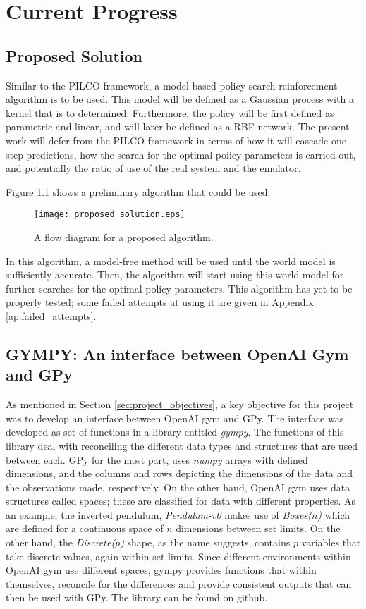 \chapter{Current Progress}
\section{Proposed Solution} \label{sec:proposed_solution}

Similar to the PILCO framework, a model based policy search reinforcement algorithm is to be used. This model will be defined as a Gaussian process with a kernel that is to determined. Furthermore, the policy will be first defined as parametric and linear, and will later be defined as a RBF-network. The present work will defer from the PILCO framework in terms of how it will cascade one-step predictions, how the search for the optimal policy parameters is carried out, and potentially the ratio of use of the real system and the emulator. 

Figure \ref{fig:proposed_solution} shows a preliminary algorithm that could be used. 

\begin{figure} \centering \scalebox{0.5} {\texttt{[image: proposed\_solution.eps]}}\caption{A flow diagram for a proposed algorithm.}\label{fig:proposed_solution}
\end{figure}

In this algorithm, a model-free method will be used until the world model is sufficiently accurate. Then, the algorithm will start using this world model for further searches for the optimal policy parameters. This algorithm has yet to be properly tested; some failed attempts at using it are given in Appendix \ref{ap:failed_attempts}.
%
\\
%
\section{GYMPY: An interface between OpenAI Gym and GPy} \label{sec:gympy_intro}

As mentioned in Section \ref{sec:project_objectives}, a key objective for this project was to develop an interface between OpenAI gym and GPy. The interface was developed as set of functions in a library entitled \emph{gympy}. The functions of this library deal with reconciling the different data types and structures that are used between each. GPy for the most part, uses \emph{numpy} arrays with defined dimensions, and the columns and rows depicting the dimensions of the data and the observations made, respectively. On the other hand, OpenAI gym uses data structures called spaces; these are classified for data with different properties. As an example, the inverted pendulum, \emph{Pendulum-v0} makes use of \emph{Boxes($n$)} which are defined for a continuous space of $n$ dimensions between set limits. On the other hand, the \emph{Discrete($p$)} shape, as the name suggests, contains $p$ variables that take discrete values, again within set limits. Since different environments within OpenAI gym use different spaces, gympy provides functions that within themselves, reconcile for the differences and provide consistent outputs that can then be used with GPy. The library can be found on github.

